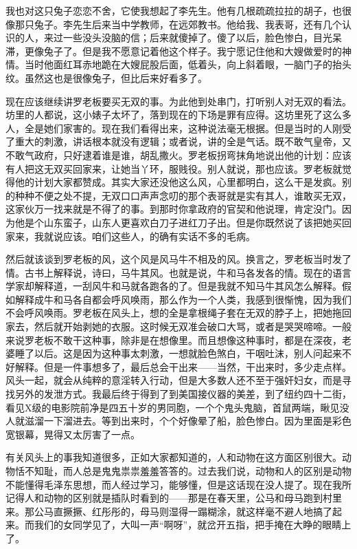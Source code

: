 我也对这只兔子恋恋不舍，它使我想起了李先生。他有几根疏疏拉拉的胡子，也很像那只兔子。李先生后来当中学教师，在远郊教书。他给我、我表哥，还有几个认识的人，来过一些没头没脑的信；后来就傻掉了。傻了以后，脸色惨白，目光呆滞，更像兔子了。但是我不愿意记着他这个样子。我宁愿记住他和大嫂做爱时的神情。当时他面红耳赤地跪在大嫂屁股后面，低着头，向上斜着眼，一脑门子的抬头纹。虽然这也是很像兔子，但比后来好看多了。 

现在应该继续讲罗老板要买无双的事。为此他到处串门，打听别人对无双的看法。坊里的人都说，这小婊子太坏了，落到现在的下场是罪有应得。这坊里死了这么多人，全是她们家害的。现在我们看得出来，这种说法毫无根据。但是当时的人刚受了重大的刺激，讲话根本就没有逻辑；或者说，讲的全是气话。既不敢气皇帝，又不敢气政府，只好逮着谁是谁，胡乱撒火。罗老板拐弯抹角地说出他的计划：应该有人把这无双买回家来，让她当丫环，服贱役。别人就说，那也应该。罗老板就觉得他的计划大家都赞成。其实大家还没他这么风，心里都明白，这么干是发疯。别的种种不便之处不提，无双口口声声念叨的那个表哥就是实有其人，谁敢买无双，这家伙万一找来就是不得了的事。到那时你拿政府的官契和他说理，肯定没门。因为他是个山东蛮子，山东人更喜欢白刀子进红刀子出。但是你既然说了该把她买回家来，我就说应该。咱们这些人，的确有实话不多的毛病。 

然后就该谈到罗老板的风，这个风是风马牛不相及的风。换言之，罗老板当时发了情。古书上解释说，诗曰，马牛其风。也就是说，牛和马各发各的情。现在的语言学家却解释道，一刮风牛和马就各跑各的了。但是我就不知马牛其风怎么解释。假如解释成牛和马各自都会呼风唤雨，那么作为一个人类，我感到很惭愧，因为我们不会呼风唤雨。罗老板在风头上，想的全是拿根绳子套在无双的脖子上，把她拖回家去，然后就开始剥她的衣服。这时候无双准会破口大骂，或者是哭哭啼啼。一般来说罗老板不敢干这种事，除非是在想像里。而且想像这种事时，都是在深夜，老婆睡了以后。这是因为这种事太刺激，一想就脸色煞白，干咽吐沫，别人问起来不好解释。但是一件事想多了，最后总会干出来——当然，干出来时，多少走点样。风头一起，就会从纯粹的意淫转入行动，但是大多数人还不至于强奸妇女，而是寻找另外的发泄方式。我最后终于得到了到美国接仪器的美差，到了纽约四十二街，看见X级的电影院前净是四五十岁的男同胞，一个个鬼头鬼脑，首鼠两端，瞅见没人就滋溜一下溜进去。等到出来时，个个好像晕了船，脸色惨白。因为里面是彩色宽银幕，晃得又太厉害了一点。 

有关风头上的事我知道很多，正如大家都知道的，人和动物在这方面区别很大。动物恬不知耻，而人总是鬼鬼祟祟羞羞答答的。过去我们说，动物和人的区别是动物不能懂得毛泽东思想，而人经过学习，能够懂，但是这话现在没人提了。现在我所记得人和动物的区别就是插队时看到的——那是在春天里，公马和母马跑到村里来。那公马直撅撅、红彤彤的，母马则湿得一蹋糊涂，就这样毫不避人地搞了起来。而我们的女同学见了，大叫一声“啊呀”，就岔开五指，把手掩在大睁的眼睛上了。 

